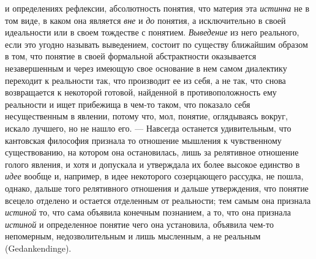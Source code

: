 \documentclass[twoside]{article}
\begin{document}
{{и определениях рефлексии, абсолютность понятия, что материя эта
{\em истинна} не в том
виде, в каком она является {\em вне}
и {\em до}
понятия, а исключительно в своей идеальности или в своем
тождестве с понятием. {\em Выведение}
из него реального, если это угодно называть выведением,
состоит по существу ближайшим образом в том, что понятие в своей формальной
абстрактности оказывается незавершенным и через имеющую свое основание в
нем самом диалектику переходит к реальности так, что производит ее из себя,
а не так, что снова возвращается к некоторой готовой, найденной в
противоположность ему реальности и ищет прибежища в чем-то таком, что
показало себя несущественным в явлении, потому что, мол,
понятие, оглядываясь вокруг, искало лучшего, но не нашло
его. — Навсегда останется удивительным, что кантовская
философия признала то отношение мышления к чувственному существованию, на
котором она остановилась, лишь за релятивное отношение голого явления, и
хотя и допускала и утверждала их более высокое единство в
{\em идее} вообще и,
например, в идее некоторого созерцающего рассудка, не пошла, однако, дальше
того релятивного отношения и дальше утверждения, что понятие всецело
отделено и остается отделенным от реальности; тем самым она признала
{\em истиной} то, что
сама объявила конечным познанием, а то, что она признала
{\em истиной} и
определенное понятие чего она установила, объявила чем-то непомерным,
недозволительным и лишь мысленным, а не реальным (Gedankendinge).

}}
\end{document}
